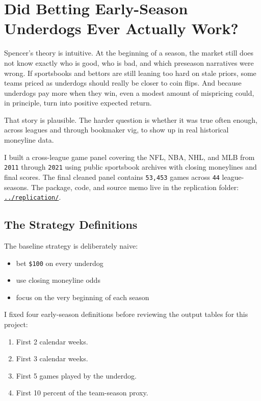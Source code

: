 \documentclass[
  letterpaper,
  DIV=11,
  numbers=noendperiod]{scrartcl}
\author{}
\date{}
\providecommand{\tightlist}{%
  \setlength{\itemsep}{0pt}\setlength{\parskip}{0pt}}\usepackage{longtable,booktabs,array}
\begin{document}
\section{Did Betting Early-Season Underdogs Ever Actually
Work?}\label{did-betting-early-season-underdogs-ever-actually-work}

Spencer's theory is intuitive. At the beginning of a season, the market
still does not know exactly who is good, who is bad, and which preseason
narratives were wrong. If sportsbooks and bettors are still leaning too
hard on stale priors, some teams priced as underdogs should really be
closer to coin flips. And because underdogs pay more when they win, even
a modest amount of mispricing could, in principle, turn into positive
expected return.

That story is plausible. The harder question is whether it was true
often enough, across leagues and through bookmaker vig, to show up in
real historical moneyline data.

I built a cross-league game panel covering the NFL, NBA, NHL, and MLB
from \texttt{2011} through \texttt{2021} using public sportsbook
archives with closing moneylines and final scores. The final cleaned
panel contains \texttt{53,453} games across \texttt{44} league-seasons.
The package, code, and source memo live in the replication folder:
\href{../replication/}{\texttt{../replication/}}.

\subsection{The Strategy Definitions}\label{the-strategy-definitions}

The baseline strategy is deliberately naive:

\begin{itemize}
\tightlist
\item
  bet \texttt{\$100} on every underdog
\item
  use closing moneyline odds
\item
  focus on the very beginning of each season
\end{itemize}

I fixed four early-season definitions before reviewing the output tables
for this project:

\begin{enumerate}
\def\labelenumi{\arabic{enumi}.}
\tightlist
\item
  First 2 calendar weeks.
\item
  First 3 calendar weeks.
\item
  First 5 games played by the underdog.
\item
  First 10 percent of the team-season proxy.
\end{enumerate}
\end{document}
